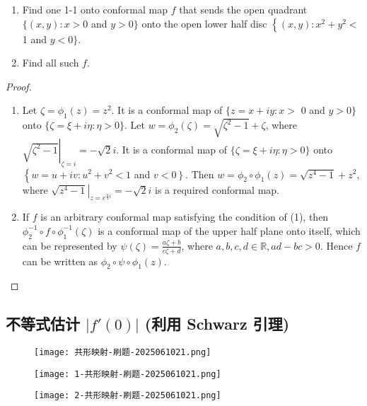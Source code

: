 \begin{exercise}[Toronto]
\begin{enumerate}
		\item Find one 1-1 onto conformal map $f$ that sends the open quadrant $\{(x, y): x>0$ and $y>0\}$ onto the open lower half disc $\left\{(x, y): x^2+y^2<\right.$ 1 and $y<0\}$.
		\item Find all such $f$.
	\end{enumerate}
\end{exercise}
\begin{proof}

\begin{enumerate}
	\item Let $\zeta=\phi_1(z)=z^2$. It is a conformal map of $\{z=x+i y: x>$ 0 and $y>0\}$ onto $\{\zeta=\xi+i \eta: \eta>0\}$.
Let $w=\phi_2(\zeta)=\sqrt{\zeta^2-1}+\zeta$, where $\left.\sqrt{\zeta^2-1}\right|_{\zeta=i}=-\sqrt{2} i$. It is a conformal map of $\{\zeta=\xi+i \eta: \eta>0\}$ onto $\left\{w=u+i v: u^2+v^2<1\right.$ and $\left.v<0\right\}$.
Then $w=\phi_2 \circ \phi_1(z)=\sqrt{z^4-1}+z^2$, where $\left.\sqrt{z^4-1}\right|_{z=e^{\frac{\pi}{4} i}}=-\sqrt{2} i$ is a required conformal map.
	\item If $f$ is an arbitrary conformal map satisfying the condition of (1), then $\phi_2^{-1} \circ f \circ \phi_1^{-1}(\zeta)$ is a conformal map of the upper half plane onto itself, which can be represented by $\psi(\zeta)=\frac{a \zeta+b}{c \zeta+d}$, where $a, b, c, d \in \mathbb{R}, a d-b c>0$. Hence $f$ can be written as $\phi_2 \circ \psi \circ \phi_1(z)$.
\end{enumerate}

\end{proof}

\subsection{不等式估计 \texorpdfstring{$\lvert f'(0) \rvert$}{|f'(0)|} (利用 Schwarz 引理)}

\begin{exercise}
\begin{figure}[H]
\centering
\texttt{[image: 共形映射-刷题-2025061021.png]}
\label{}
\end{figure}
\end{exercise}
\begin{figure}[H]
\centering
\texttt{[image: 1-共形映射-刷题-2025061021.png]}
\label{}
\end{figure}
\begin{figure}[H]
\centering
\texttt{[image: 2-共形映射-刷题-2025061021.png]}
\label{}
\end{figure}

